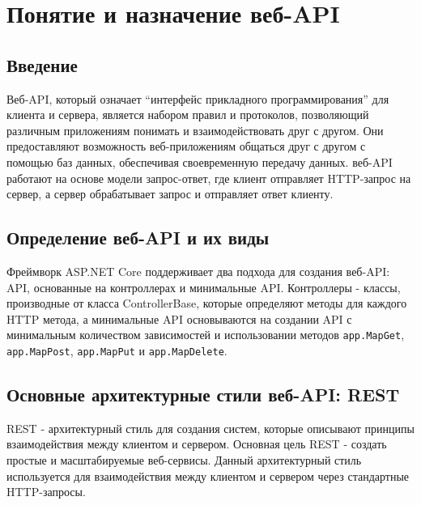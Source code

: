\documentclass[a4paper,12pt]{report}
\begin{document}
\section{Понятие и назначение веб-\acs{API}}

\subsection{Введение}

Веб-\acs{API}, который означает “интерфейс прикладного программирования” для клиента и сервера, 
является набором правил и протоколов, позволяющий различным приложениям понимать и взаимодействовать 
друг с другом. Они предоставляют возможность веб-приложениям общаться друг с другом с помощью баз данных, 
обеспечивая своевременную передачу данных. веб-\acs{API} работают на основе модели запрос-ответ, где клиент 
отправляет \acs{HTTP}-запрос  на сервер, а сервер обрабатывает запрос и отправляет ответ клиенту.

\subsection{Определение веб-\acs{API} и их виды}

Фреймворк ASP.NET Core поддерживает два подхода для создания веб-\acs{API}: \acs{API}, основанные на контроллерах 
и минимальные \acs{API}. Контроллеры - классы, производные от класса ControllerBase, которые определяют методы 
для каждого \acs{HTTP} метода, а минимальные \acs{API} основываются на создании \acs{API} с минимальным количеством 
зависимостей и использовании методов \texttt{app.MapGet}, \texttt{app.MapPost}, \texttt{app.MapPut} и \texttt{app.MapDelete}.\cite{controller_vs_minimal_api}

\subsection{Основные архитектурные стили веб-\acs{API}: \acs{REST}}

\ac{REST} - архитектурный стиль для создания систем, которые описывают принципы 
взаимодействия между клиентом и сервером. Основная цель \acs{REST} - создать простые и масштабируемые веб-сервисы. 
Данный архитектурный стиль используется для взаимодействия между клиентом и сервером через стандартные \acs{HTTP}-запросы.
\end{document}
